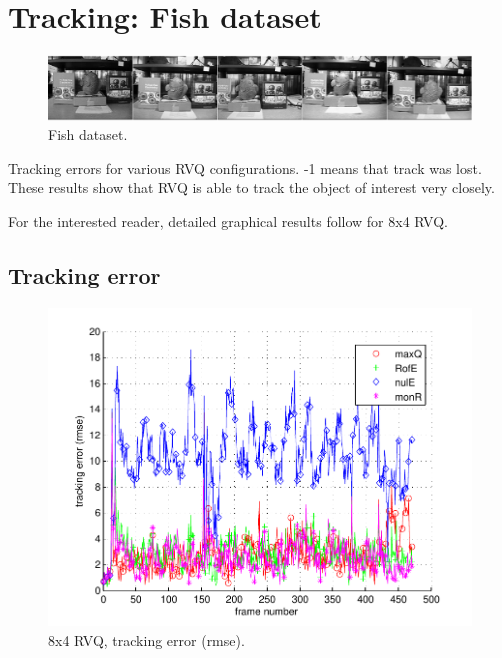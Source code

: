 \clearpage
\newpage
\section{Tracking: Fish dataset} 
								\begin{figure}[h!]
								\centering
								\includegraphics[width=1.0\textwidth]{thesis/seq_5_fish.png}
								\caption{Fish dataset.}
								\label{fig:seq_5_fish}
								\end{figure}



\begin{table}[h]
\centering

\caption{Tracking errors for various RVQ configurations.  -1 means that track was lost.  These results show that RVQ is able to track the object of interest very closely.}
\end{table}

For the interested reader, detailed graphical results follow for 8x4 RVQ.
\clearpage
\newpage
\subsection{Tracking error}

								\begin{figure}[h!]
								\centering
								\includegraphics[height=0.38\textheight]{thesis/5_fish_8_4_1000_trk_rmse.pdf}
								\caption{8x4 RVQ, tracking error (rmse).}
								\label{fig:5_fish_8_4_1000_trk_rmse}
								\end{figure}



